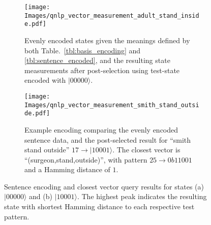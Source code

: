\begin{figure}[h!]
    \begin{subfigure}{\textwidth}
        \centering
        \texttt{[image: Images/qnlp\_vector\_measurement\_adult\_stand\_inside.pdf]}
        \caption{Evenly encoded states given the meanings defined by both Table.~\eqref{tbl:basis_encoding} and \eqref{tbl:sentence_encoded}, and the resulting state measurements after post-selection using test-state encoded with $\vert 00000 \rangle $.}
    \end{subfigure}
    \vspace{1cm}
    \begin{subfigure}{\textwidth}
        \centering
        \texttt{[image: Images/qnlp\_vector\_measurement\_smith\_stand\_outside.pdf]}
        \caption{Example encoding comparing the evenly encoded sentence data, and the post-selected result for ``smith stand outside'' $ 17 \rightarrow \vert 10001\rangle$. The closest vector is ``(surgeon,stand,outside)'', with pattern $25 \rightarrow 0b11001$ and a Hamming distance of $1$.}
    \end{subfigure}
    \caption{Sentence encoding and closest vector query results for states (a) $\vert 00000 \rangle$ and (b) $\vert 10001\rangle$. The highest peak indicates the resulting state with shortest Hamming distance to each respective test pattern.}
    \label{fig:encoded_patterns}
\end{figure}
\clearpage

